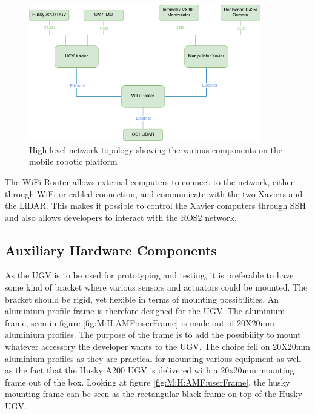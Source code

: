 \begin{figure}[htp]
  \centering
  \includegraphics[width = 0.9\textwidth]{Figures/example_figure.drawio.png}
  \caption{High level network topology showing the various components on the mobile robotic platform}
  \label{fig:topology}
\end{figure}

The WiFi Router allows external computers to connect to the network, either through WiFi or cabled connection, and communicate with the two Xaviers and the LiDAR. This makes it possible to control the Xavier computers through SSH and also allows developers to interact with the ROS2 network.


\subsection{Auxiliary Hardware Components} \label{sec:M:HA:AuxiliaryHardware}
As the UGV is to be used for prototyping and testing, it is preferable to have some kind of bracket where various sensors and actuators could be mounted. The bracket should be rigid, yet flexible in terms of mounting possibilities. An aluminium profile frame is therefore designed for the UGV. The aluminium frame, seen in figure \ref{fig:M:H:AMF:userFrame} is made out of 20X20mm aluminium profiles. The purpose of the frame is to add the possibility to mount whatever accessory the developer wants to the UGV. The choice fell on 20X20mm aluminium profiles as they are practical for mounting various equipment as well as the fact that the Husky A200 UGV is delivered with a 20x20mm mounting frame out of the box. Looking at figure \ref{fig:M:H:AMF:userFrame}, the husky mounting frame can be seen as the rectangular black frame on top of the Husky UGV.


